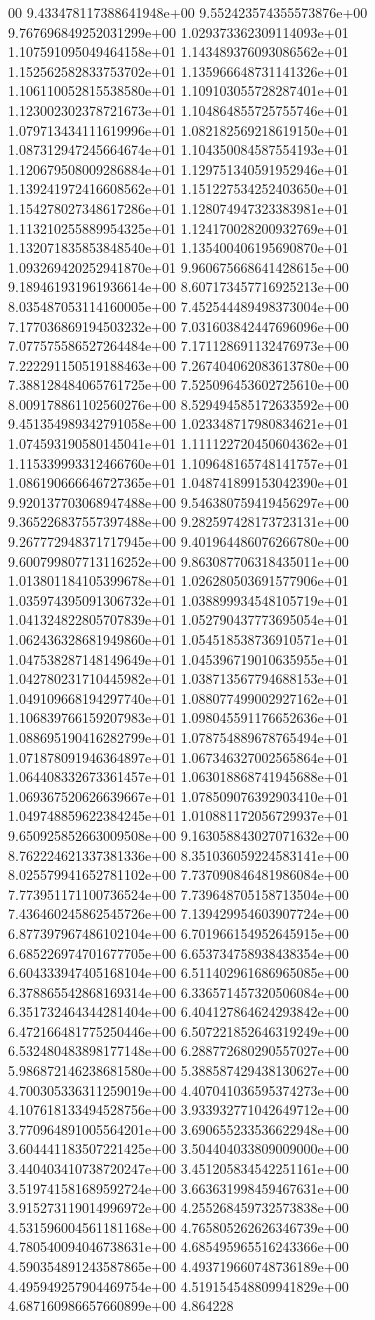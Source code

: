 00	9.433478117388641948e+00	9.552423574355573876e+00	9.767696849252031299e+00	1.029373362309114093e+01	1.107591095049464158e+01	1.143489376093086562e+01	1.152562582833753702e+01	1.135966648731141326e+01	1.106110052815538580e+01	1.109103055728287401e+01	1.123002302378721673e+01	1.104864855725755746e+01	1.079713434111619996e+01	1.082182569218619150e+01	1.087312947245664674e+01	1.104350084587554193e+01	1.120679508009286884e+01	1.129751340591952946e+01	1.139241972416608562e+01	1.151227534252403650e+01	1.154278027348617286e+01	1.128074947323383981e+01	1.113210255889954325e+01	1.124170028200932769e+01	1.132071835853848540e+01	1.135400406195690870e+01	1.093269420252941870e+01	9.960675668641428615e+00	9.189461931961936614e+00	8.607173457716925213e+00	8.035487053114160005e+00	7.452544489498373004e+00	7.177036869194503232e+00	7.031603842447696096e+00	7.077575586527264484e+00	7.171128691132476973e+00	7.222291150519188463e+00	7.267404062083613780e+00	7.388128484065761725e+00	7.525096453602725610e+00	8.009178861102560276e+00	8.529494585172633592e+00	9.451354989342791058e+00	1.023348717980834621e+01	1.074593190580145041e+01	1.111122720450604362e+01	1.115339993312466760e+01	1.109648165748141757e+01	1.086190666646727365e+01	1.048741899153042390e+01	9.920137703068947488e+00	9.546380759419456297e+00	9.365226837557397488e+00	9.282597428173723131e+00	9.267772948371717945e+00	9.401964486076266780e+00	9.600799807713116252e+00	9.863087706318435011e+00	1.013801184105399678e+01	1.026280503691577906e+01	1.035974395091306732e+01	1.038899934548105719e+01	1.041324822805707839e+01	1.052790437773695054e+01	1.062436328681949860e+01	1.054518538736910571e+01	1.047538287148149649e+01	1.045396719010635955e+01	1.042780231710445982e+01	1.038713567794688153e+01	1.049109668194297740e+01	1.088077499002927162e+01	1.106839766159207983e+01	1.098045591176652636e+01	1.088695190416282799e+01	1.078754889678765494e+01	1.071878091946364897e+01	1.067346327002565864e+01	1.064408332673361457e+01	1.063018868741945688e+01	1.069367520626639667e+01	1.078509076392903410e+01	1.049748859622384245e+01	1.010881172056729937e+01	9.650925852663009508e+00	9.163058843027071632e+00	8.762224621337381336e+00	8.351036059224583141e+00	8.025579941652781102e+00	7.737090846481986084e+00	7.773951171100736524e+00	7.739648705158713504e+00	7.436460245862545726e+00	7.139429954603907724e+00	6.877397967486102104e+00	6.701966154952645915e+00	6.685226974701677705e+00	6.653734758938438354e+00	6.604333947405168104e+00	6.511402961686965085e+00	6.378865542868169314e+00	6.336571457320506084e+00	6.351732464344281404e+00	6.404127864624293842e+00	6.472166481775250446e+00	6.507221852646319249e+00	6.532480483898177148e+00	6.288772680290557027e+00	5.986872146238681580e+00	5.388587429438130627e+00	4.700305336311259019e+00	4.407041036595374273e+00	4.107618133494528756e+00	3.933932771042649712e+00	3.770964891005564201e+00	3.690655233536622948e+00	3.604441183507221425e+00	3.504404033809009000e+00	3.440403410738720247e+00	3.451205834542251161e+00	3.519741581689592724e+00	3.663631998459467631e+00	3.915273119014996972e+00	4.255268459732573838e+00	4.531596004561181168e+00	4.765805262626346739e+00	4.780540094046738631e+00	4.685495965516243366e+00	4.590354891243587865e+00	4.493719660748736189e+00	4.495949257904469754e+00	4.519154548809941829e+00	4.687160986657660899e+00	4.864228